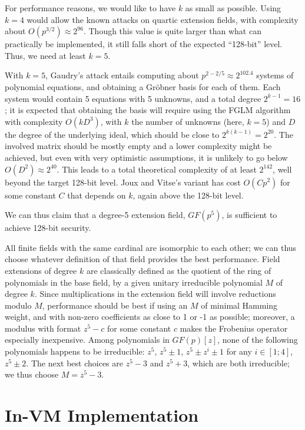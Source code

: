 \documentclass{llncs}
\newcommand{\GF}{GF}
\begin{document}
For performance reasons, we would like to have $k$ as small as possible.
Using $k = 4$ would allow the known attacks on quartic extension
fields\cite{AriMatNagShi2004}, with complexity about $O(p^{3/2}) \approx
2^{96}$. Though this value is quite larger than what can practically be
implemented, it still falls short of the expected ``128-bit'' level.
Thus, we need at least $k = 5$.

With $k = 5$, Gaudry's attack entails computing about $p^{2-2/5} \approx
2^{102.4}$ systems of polynomial equations, and obtaining a Gröbner
basis for each of them. Each system would contain 5 equations with 5
unknowns, and a total degree $2^{k-1} = 16$; it is expected that
obtaining the basis will require using the FGLM
algorithm\cite{FauGiaLazMor1993} with complexity $O(k D^3)$, with $k$
the number of unknowns (here, $k = 5$) and $D$ the degree of the
underlying ideal, which should be close to $2^{k(k-1)} = 2^{20}$. The
involved matrix should be mostly empty and a lower complexity might be
achieved, but even with very optimistic assumptions, it is unlikely to
go below $O(D^2) \approx 2^{40}$. This leads to a total theoretical
complexity of at least $2^{142}$, well beyond the target 128-bit level.
Joux and Vitse's variant has cost $O(C p^2)$ for some constant $C$ that
depends on $k$, again above the 128-bit level.

We can thus claim that a degree-5 extension field, $\GF(p^5)$, is
sufficient to achieve 128-bit security.

All finite fields with the same cardinal are isomorphic to each other;
we can thus choose whatever definition of that field provides the best
performance. Field extensions of degree $k$ are classically defined as
the quotient of the ring of polynomials in the base field, by a given
unitary irreducible polynomial $M$ of degree $k$. Since multiplications
in the extension field will involve reductions modulo $M$, performance
should be best if using an $M$ of minimal Hamming weight, and with
non-zero coefficients as close to 1 or -1 as possible; moreover, a
modulus with format $z^5 - c$ for some constant $c$ makes the Frobenius
operator especially inexpensive. Among polynomials in $\GF(p)[z]$, none
of the following polynomials happens to be irreducible: $z^5$, $z^5 \pm
1$, $z^5 \pm z^i \pm 1$ for any $i \in [1;4]$, $z^5 \pm 2$. The next
best choices are $z^5 - 3$ and $z^5 + 3$, which are both irreducible; we
thus choose $M = z^5 - 3$.

\section{In-VM Implementation}
\end{document}
